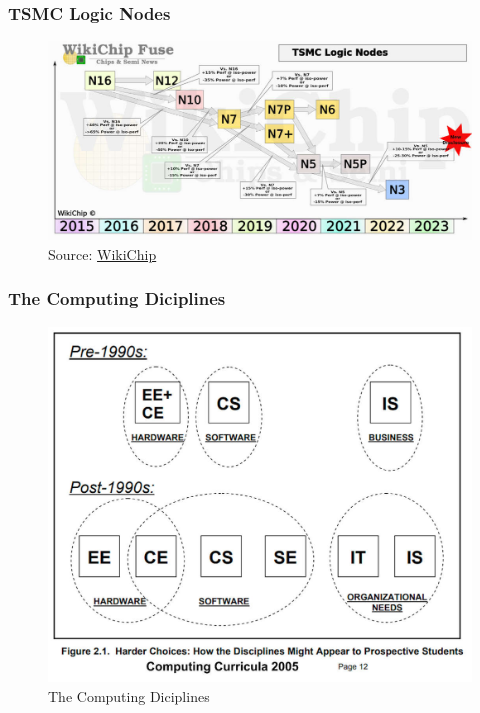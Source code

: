 \documentclass[aspectratio=169, xcolor=table, notheorems, hyperref={pdfpagelabels=false}]{beamer}
\begin{document}
\begin{frame}[fragile]
\frametitle{TSMC Logic Nodes}
\begin{figure}
\includegraphics[width=0.95\linewidth]{tsmc_logic_node}
\caption{Source: 
  \href{https://fuse.wikichip.org/wp-content/uploads/2020/04/wikichip_tsmc_logic_node_q1_2020.png}{WikiChip}}
\end{figure}
\end{frame}

\begin{frame}[fragile]
\frametitle{The Computing Diciplines}
\begin{figure}
\includegraphics[width=0.59\linewidth]{pic-cc2005}
\caption{The Computing Diciplines}
\end{figure}
\end{frame}
\end{document}
